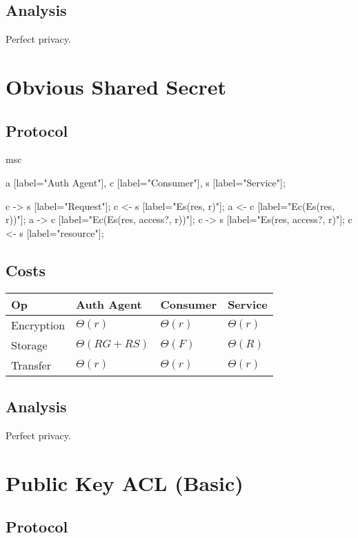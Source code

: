 \documentclass[pdftex,12pt,a4papaer]{article}
\begin{document}
\subsection{Analysis}

Perfect privacy.

\pagebreak

\section{Obvious Shared Secret}  %

\subsection{Protocol}

\begin{msc}
msc {
    a [label="Auth Agent"],
    c [label="Consumer"],
    s [label="Service"];

    c -> s [label="Request"];
    c <- s [label="Es(res, r)"];
    a <- c [label="Ec(Es(res, r))"];
    a -> c [label="Ec(Es(res, access?, r))"];
    c -> s [label="Es(res, access?, r)"];
    c <- s [label="resource"];
}
\end{msc}

\subsection{Costs}

\begin{tabular}{l|l|l|l}
 Op & Auth Agent & Consumer & Service \\ \hline
 Encryption & $\Theta(r)$ & $\Theta(r)$ & $\Theta(r)$ \\
    Storage & $\Theta(RG+RS)$ & $\Theta(F)$ & $\Theta(R)$ \\
    Transfer & $\Theta(r)$ & $\Theta(r)$ & $\Theta(r)$
\end{tabular}

\subsection{Analysis}

Perfect privacy.

\pagebreak

\section{Public Key ACL (Basic)}  %

\subsection{Protocol}
\end{document}

